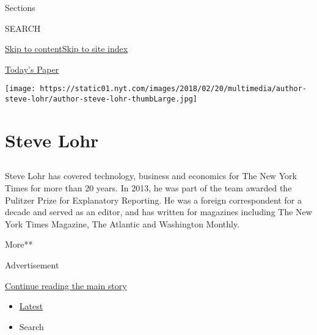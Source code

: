Sections

SEARCH

\protect\hyperlink{site-content}{Skip to
content}\protect\hyperlink{site-index}{Skip to site index}

\href{https://myaccount.nytimes.com/auth/login?response_type=cookie\&client_id=vi}{}

\href{https://www.nytimes.com/section/todayspaper}{Today's Paper}

\texttt{[image: https://static01.nyt.com/images/2018/02/20/multimedia/author-steve-lohr/author-steve-lohr-thumbLarge.jpg]}

\hypertarget{steve-lohr}{%
\section{Steve Lohr}\label{steve-lohr}}

\subsection{}

Steve Lohr has covered technology, business and economics for The New
York Times for more than 20 years. In 2013, he was part of the team
awarded the Pulitzer Prize for Explanatory Reporting. He was a foreign
correspondent for a decade and served as an editor, and has written for
magazines including The New York Times Magazine, The Atlantic and
Washington Monthly.

More**

Advertisement

\protect\hyperlink{after-mid1}{Continue reading the main story}

\begin{itemize}
\tightlist
\item
  \protect\hyperlink{stream-panel}{Latest}
\item
  Search
\end{itemize}

